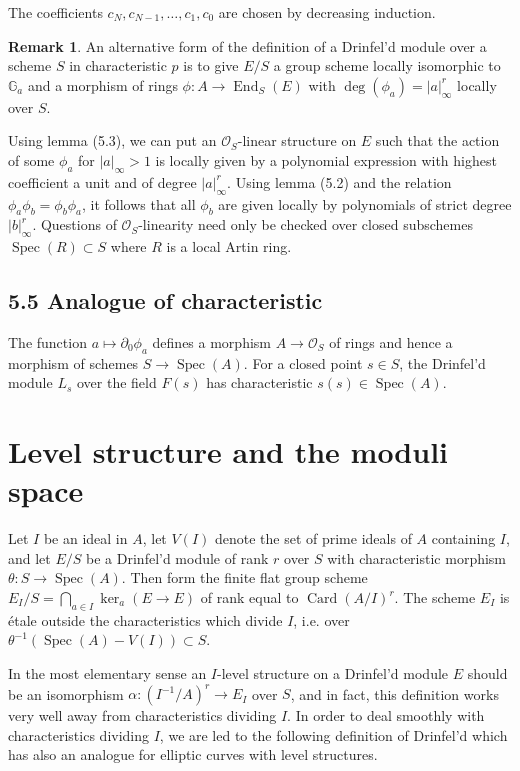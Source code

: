 \documentclass[12pt,a4paper]{article}
\theoremstyle{plain}
\theoremstyle{definition}
\newtheorem{remark}{Remark}[section]
\theoremstyle{remark}
\DeclareMathOperator{\End}{End}
\DeclareMathOperator{\Spec}{Spec}
\DeclareMathOperator{\Card}{Card}
\begin{document}
The coefficients $c_N, c_{N-1}, \ldots, c_1, c_0$ are chosen by decreasing 
induction.

\begin{remark}
An alternative form of the definition of a Drinfel'd module over a scheme $S$ 
in characteristic $p$ is to give $E/S$ a group scheme locally isomorphic to 
$\mathbb{G}_a$ and a morphism of rings $\phi\colon A \to \End_S(E)$ with 
$\deg(\phi_a) = |a|_\infty^r$ locally over $S$.

Using lemma (5.3), we can put an $\mathcal{O}_S$-linear structure on $E$ such 
that the action of some $\phi_a$ for $|a|_\infty > 1$ is locally given by a 
polynomial expression with highest coefficient a unit and of degree 
$|a|_\infty^r$. Using lemma (5.2) and the relation 
$\phi_a \phi_b = \phi_b \phi_a$, it follows that all $\phi_b$ are given locally 
by polynomials of strict degree $|b|_\infty^r$. Questions of 
$\mathcal{O}_S$-linearity need only be checked over closed subschemes 
$\Spec(R) \subset S$ where $R$ is a local Artin ring.
\end{remark}

\subsection*{5.5 Analogue of characteristic}

The function $a \mapsto \partial_0\phi_a$ defines a morphism $A \to \mathcal{O}_S$ 
of rings and hence a morphism of schemes $S \to \Spec(A)$. For a closed point 
$s \in S$, the Drinfel'd module $L_s$ over the field $F(s)$ has characteristic 
$s(s) \in \Spec(A)$.


\section{Level structure and the moduli space}

Let $I$ be an ideal in $A$, let $V(I)$ denote the set of prime ideals of $A$ 
containing $I$, and let $E/S$ be a Drinfel'd module of rank $r$ over $S$ with 
characteristic morphism $\theta\colon S \to \Spec(A)$. Then form the finite flat 
group scheme $E_I/S = \bigcap_{a \in I} \ker_a(E \to E)$ of rank equal to 
$\Card(A/I)^r$. The scheme $E_I$ is \'etale outside the characteristics which 
divide $I$, i.e. over $\theta^{-1}(\Spec(A) - V(I)) \subset S$.

In the most elementary sense an $I$-level structure on a Drinfel'd module $E$ 
should be an isomorphism $\alpha\colon (I^{-1}/A)^r \to E_I$ over $S$, and in 
fact, this definition works very well away from characteristics dividing $I$. 
In order to deal smoothly with characteristics dividing $I$, we are led to the 
following definition of Drinfel'd which has also an analogue for elliptic 
curves with level structures.
\end{document}
